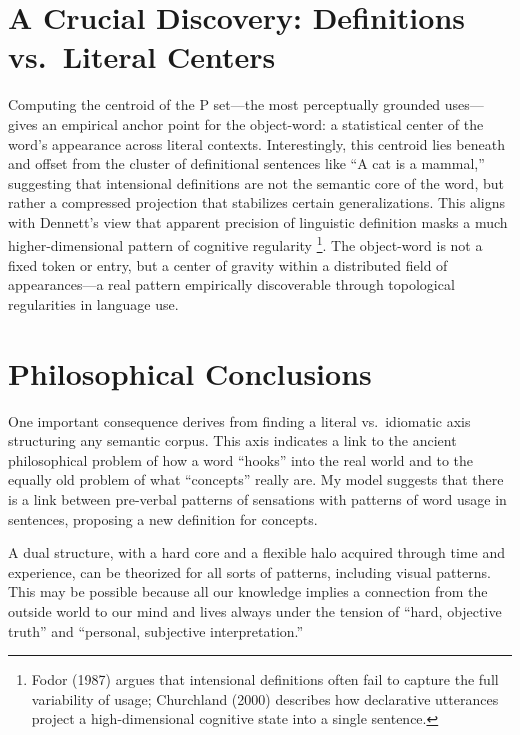 \documentclass[12pt]{article}
\begin{document}
\section{A Crucial Discovery: Definitions vs.~Literal Centers}\label{a-crucial-discovery-definitions-vs.-literal-centers}

Computing the centroid of the P set---the most perceptually grounded uses---gives an empirical anchor point for the object-word: a statistical center of the word's appearance across literal contexts. Interestingly, this centroid lies beneath and offset from the cluster of definitional sentences like ``A cat is a mammal,'' suggesting that intensional definitions are not the semantic core of the word, but rather a compressed projection that stabilizes certain generalizations. This aligns with Dennett's view that apparent precision of linguistic definition masks a much higher-dimensional pattern of cognitive regularity \cite{ref-fodorPsychosemantics1987,ref-churchlandNeurocomputational2000}\footnote{Fodor (1987) argues that intensional definitions often fail to capture the full variability of usage; Churchland (2000) describes how declarative utterances project a high-dimensional cognitive state into a single sentence.}. The object-word is not a fixed token or entry, but a center of gravity within a distributed field of appearances---a real pattern empirically discoverable through topological regularities in language use.

\section{Philosophical Conclusions}\label{philosophical-conclusions}

One important consequence derives from finding a literal vs.~idiomatic axis structuring any semantic corpus. This axis indicates a link to the ancient philosophical problem of how a word ``hooks'' into the real world and to the equally old problem of what ``concepts'' really are. My model suggests that there is a link between pre-verbal patterns of sensations with patterns of word usage in sentences, proposing a new definition for concepts.

A dual structure, with a hard core and a flexible halo acquired through time and experience, can be theorized for all sorts of patterns, including visual patterns. This may be possible because all our knowledge implies a connection from the outside world to our mind and lives always under the tension of ``hard, objective truth'' and ``personal, subjective interpretation.''
\end{document}
